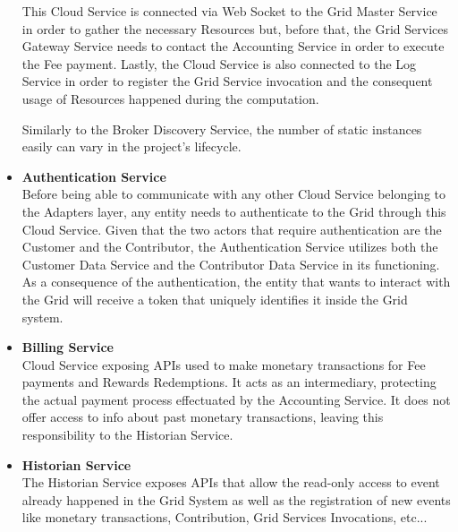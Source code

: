 \begin{itemize}
    This Cloud Service is connected via Web Socket to the Grid Master Service in order to gather the necessary Resources but, before that, the Grid Services Gateway Service needs to contact the Accounting Service in order to execute the Fee payment. Lastly, the Cloud Service is also connected to the Log Service in order to register the Grid Service invocation and the consequent usage of Resources happened during the computation.

    Similarly to the Broker Discovery Service, the number of static instances easily can vary in the project's lifecycle. 

    \item \textbf{Authentication Service}\\
    Before being able to communicate with any other Cloud Service belonging to the Adapters layer, any entity needs to authenticate to the Grid through this Cloud Service. Given that the two actors that require authentication are the Customer and the Contributor, the Authentication Service utilizes both the Customer Data Service and the Contributor Data Service in its functioning. As a consequence of the authentication, the entity that wants to interact with the Grid will receive a token that uniquely identifies it inside the Grid system.

    \item \textbf{Billing Service}\\
    Cloud Service exposing APIs used to make monetary transactions for Fee payments and Rewards Redemptions. It acts as an intermediary, protecting the actual payment process effectuated by the Accounting Service.
    It does not offer access to info about past monetary transactions, leaving this responsibility to the Historian Service.

    \item \textbf{Historian Service}\\
    The Historian Service exposes APIs that allow the read-only access to event already happened in the Grid System as well as the registration of new events like monetary transactions, Contribution, Grid Services Invocations, etc...

\end{itemize}
\vspace{20mm}

